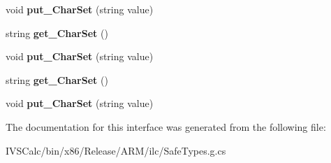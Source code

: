 \begin{DoxyCompactItemize}
\item 
\mbox{\label{interface_windows_1_1_web_1_1_http_1_1_headers_1_1_i_http_media_type_header_value_afbb0bada944b4050da266cc1290df488}} 
void {\bfseries put\+\_\+\+Char\+Set} (string value)
\item 
\mbox{\label{interface_windows_1_1_web_1_1_http_1_1_headers_1_1_i_http_media_type_header_value_a06c664adae5f56ea18dce97ff84642e4}} 
string {\bfseries get\+\_\+\+Char\+Set} ()
\item 
\mbox{\label{interface_windows_1_1_web_1_1_http_1_1_headers_1_1_i_http_media_type_header_value_afbb0bada944b4050da266cc1290df488}} 
void {\bfseries put\+\_\+\+Char\+Set} (string value)
\item 
\mbox{\label{interface_windows_1_1_web_1_1_http_1_1_headers_1_1_i_http_media_type_header_value_a06c664adae5f56ea18dce97ff84642e4}} 
string {\bfseries get\+\_\+\+Char\+Set} ()
\item 
\mbox{\label{interface_windows_1_1_web_1_1_http_1_1_headers_1_1_i_http_media_type_header_value_afbb0bada944b4050da266cc1290df488}} 
void {\bfseries put\+\_\+\+Char\+Set} (string value)
\end{DoxyCompactItemize}


The documentation for this interface was generated from the following file\+:\begin{DoxyCompactItemize}
\item 
I\+V\+S\+Calc/bin/x86/\+Release/\+A\+R\+M/ilc/Safe\+Types.\+g.\+cs\end{DoxyCompactItemize}
